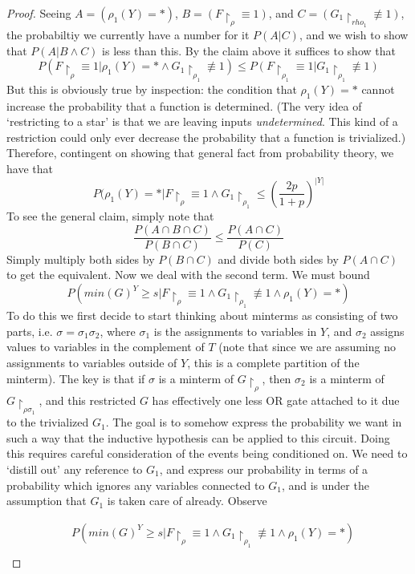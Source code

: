 \documentclass{article}
\theoremstyle{definition}
\theoremstyle{plain}
\theoremstyle{theorem}
\begin{document}
\begin{proof}
Seeing $A = (\rho_1(Y) = *)$, $B = (F \restriction_{\rho} \equiv 1)$, and $C = (G_1 \restriction_{rho_1} \not\equiv 1)$, the probabiltiy we currently have a number for it $P(A|C)$, and we wish to show that $P(A|B \wedge C)$ is less than this. By the claim above it suffices to show that
\[ P(F \restriction_{\rho} \equiv 1 | \rho_1(Y) = * \wedge G_1\restriction_{\rho_1} \not\equiv 1) \leq P(F \restriction_{\rho_1} \equiv 1 | G_1 \restriction_{\rho_1} \not\equiv 1) \]
But this is obviously true by inspection: the condition that $\rho_1(Y) = *$ cannot increase the probability that a function is determined. (The very idea of `restricting to a star' is that we are leaving inputs \emph{undetermined}. This kind of a restriction could only ever decrease the probability that a function is trivialized.) Therefore, contingent on showing that general fact from probability theory, we have that 
\[ P(\rho_1(Y) = *|F \restriction_{\rho} \equiv 1 \wedge G_1 \restriction_{\rho_1} 
\leq \left( \frac{2p}{1+p} \right)^{|Y|} \]
To see the general claim, simply note that
\[ \frac{P(A \cap B \cap C)}{P(B \cap C)} \leq \frac{P(A \cap C)}{P(C)} \]
Simply multiply both sides by $P(B \cap C)$ and divide both sides by $P(A \cap C)$ to get the equivalent. Now we deal with the second term. We must bound
\[ P(min(G)^Y \geq s | F \restriction_{\rho} \equiv 1 \wedge G_1 \restriction_{\rho_1} \not\equiv 1 \wedge \rho_1(Y) = *) \]
To do this we first decide to start thinking about minterms as consisting of two parts, i.e. $\sigma = \sigma_1\sigma_2$, where $\sigma_1$ is the assignments to variables in $Y$, and $\sigma_2$ assigns values to variables in the complement of $T$ (note that since we are assuming no assignments to variables outside of $Y$, this is a complete partition of the minterm). The key is that if $\sigma$ is a minterm of $G \restriction_{\rho}$, then $\sigma_2$ is a minterm of $G \restriction_{\rho \sigma_1}$, and this restricted $G$ has effectively one less OR gate attached to it due to the trivialized $G_1$. The goal is to somehow express the probability we want in such a way that the inductive hypothesis can be applied to this circuit. Doing this requires careful consideration of the events being conditioned on. We need to `distill out' any reference to $G_1$, and express our probability in terms of a probability which ignores any variables connected to $G_1$, and is under the assumption that $G_1$ is taken care of already. Observe \par 
\begin{align*}
	 & P(min(G)^Y \geq s | F \restriction_{\rho} \equiv 1 \wedge G_1 \restriction_{\rho_1} \not\equiv 1 \wedge \rho_1(Y) = *)  \\

\end{align*}
\end{proof}
\end{document}
